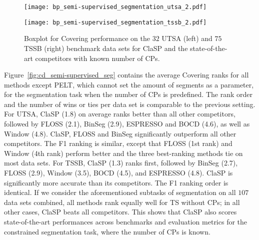 \documentclass[pdflatex,sn-basic]{sn-jnl}
\begin{document}
\begin{figure}[t]
	\begin{minipage}{6cm}
        \texttt{[image: bp\_semi-supervised\_segmentation\_utsa\_2.pdf]}
	\end{minipage}
	\begin{minipage}{6cm}
        \texttt{[image: bp\_semi-supervised\_segmentation\_tssb\_2.pdf]}
	\end{minipage}
	\caption{Boxplot for Covering performance on the $32$ UTSA (left) and $75$ TSSB (right) benchmark data sets for ClaSP and the state-of-the-art competitors with known number of CPs.\label{fig:boxplot_semi-supervised_seg}
	}
\end{figure}

Figure~\ref{fig:cd_semi-supervised_seg} contains the average Covering ranks for all methods except PELT, which cannot set the amount of segments as a parameter, for the segmentation task when the number of CPs is predefined. The rank order and the number of wins or ties per data set is comparable to the previous setting. For UTSA, ClaSP (1.8) on average ranks better than all other competitors, followed by FLOSS (2.1), BinSeg (2.9), ESPRESSO and BOCD (4.6), as well as Window (4.8). ClaSP, FLOSS and BinSeg significantly outperform all other competitors. The F1 ranking is similar, except that FLOSS (1st rank) and Window (4th rank) perform better and the three best-ranking methods tie on most data sets. For TSSB, ClaSP (1.3) ranks first, followed by BinSeg (2.7), FLOSS (2.9), Window (3.5), BOCD (4.5), and ESPRESSO (4.8). ClaSP is significantly more accurate than its competitors. The F1 ranking order is identical. If we consider the aforementioned subtasks of segmentation on all $107$ data sets combined, all methods rank equally well for TS without CPs; in all other cases, ClaSP beats all competitors. This shows that ClaSP also scores state-of-the-art performances across benchmarks and evaluation metrics for the constrained segmentation task, where the number of CPs is known.
\end{document}
